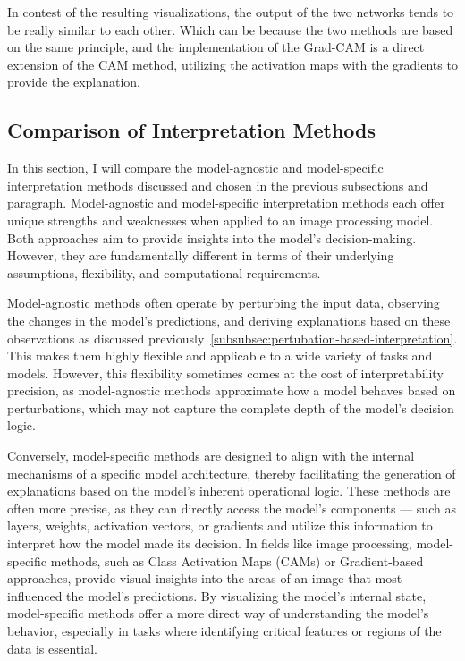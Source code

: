 In contest of the resulting visualizations, the output of the two networks tends to be really similar to each other.
Which can be because the two methods are based on the same principle, and the implementation of the Grad-CAM
is a direct extension of the CAM method, utilizing the activation maps with the gradients to provide the explanation.

\subsection{Comparison of Interpretation Methods}\label{subsec:evaluation-interpretation-methods}

In this section, I will compare the model-agnostic and model-specific interpretation methods discussed and chosen in the previous subsections
and paragraph.
Model-agnostic and model-specific interpretation methods each offer unique strengths and weaknesses when applied to
an image processing model.
Both approaches aim to provide insights into the model's decision-making.
However, they are fundamentally different in terms of their underlying assumptions, flexibility, and computational requirements.


Model-agnostic methods often operate by perturbing the input data, observing the changes in the model’s predictions,
and deriving explanations based on these observations as discussed previously~\ref{subsubsec:pertubation-based-interpretation}.
This makes them highly flexible and applicable to a wide variety of tasks and models.
However, this flexibility sometimes comes at the cost of interpretability precision, as model-agnostic methods approximate
how a model behaves based on perturbations, which may not capture the complete depth of the model’s decision logic.

Conversely, model-specific methods are designed to align with the internal mechanisms of a specific model architecture,
thereby facilitating the generation of explanations based on the model's inherent operational logic.
These methods are often more precise, as they can directly access the model's components — such as layers,
weights, activation vectors, or gradients and utilize this information to interpret how the model made its decision.
In fields like image processing, model-specific methods, such as Class Activation Maps (CAMs) or Gradient-based approaches,
provide visual insights into the areas of an image that most influenced the model’s predictions.
By visualizing the model’s internal state, model-specific methods offer a more direct way of understanding the model’s behavior,
especially in tasks where identifying critical features or regions of the data is essential.

